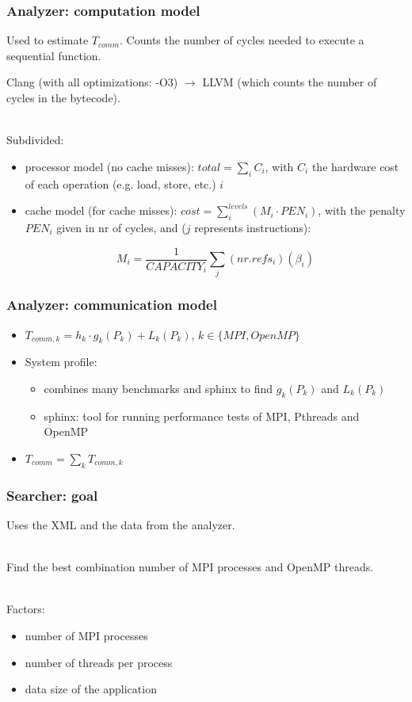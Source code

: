 \documentclass{beamer}
\begin{document}
\begin{frame}
\frametitle{Analyzer: computation model}

Used to estimate $T_{comm}$. Counts the number of cycles needed to execute a sequential function.

Clang (with all optimizations: -O3) $\rightarrow$ LLVM (which counts the number of cycles in the bytecode).

\ \\

Subdivided:

\begin{itemize}

\item processor model (no cache misses): $total = \sum_{i}C_{i}$, with $C_{i}$ the hardware cost of each operation (e.g. load, store, etc.) $i$
\item cache model (for cache misses): $cost = \sum_{i}^{levels}(M_{i}\cdot PEN_{i})$, with the penalty $PEN_{i}$ given in nr of cycles, and ($j$ represents instructions):

$$M_{i} = \frac{1}{CAPACITY_{i}}\sum_{j}(nr.refs_{i})(\beta_{i})$$

\end{itemize}

\end{frame}

\begin{frame}
\frametitle{Analyzer: communication model}

\begin{itemize}
\item $T_{comm,k} = h_{k}\cdot g_{k}(P_{k}) + L_{k}(P_{k})$, $k\in \{ MPI, OpenMP \}$
\item System profile:
\begin{itemize}
\item combines many benchmarks and sphinx to find $g_{k}(P_{k})$ and $L_{k}(P_{k})$
\item sphinx: tool for running performance tests of MPI, Pthreads and OpenMP
\end{itemize}
\item $T_{comm} = \sum_{k}T_{comm,k}$
\end{itemize}

\end{frame}


\begin{frame}
\frametitle{Searcher: goal}

Uses the XML and the data from the analyzer.

\ \\

Find the best combination number of MPI processes and OpenMP threads.

\ \\

Factors:

\begin{itemize}
\item number of MPI processes
\item number of threads per process
\item data size of the application
\end{itemize}

\end{frame}
\end{document}
